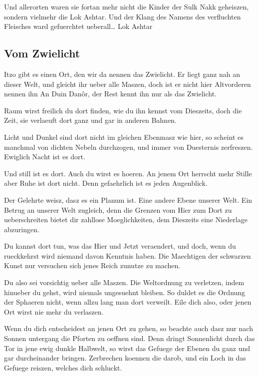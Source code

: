 \documentclass[a5paper,8pt]{book}
\begin{document}
Und allerorten waren sie fortan mehr nicht die Kinder der Sulk Nakk geheiszen, sondern vielmehr die Lok Ashtar. Und der Klang des Namens des verfluchten Fleisches ward gefuerchtet ueberall…
Lok Ashtar

\newpage

\subsection{ Vom Zwielicht}

Itzo gibt es einen Ort, den wir da nennen das Zwielicht.
Er liegt ganz nah an dieser Welt, und gleicht ihr ueber alle Maszen, doch ist er nicht hier
Altvorderen nennen ihn An Duin Danôr, der Rest kennt ihn nur als das Zwielicht.

Raum wirst freilich du dort finden, wie du ihn kennst vom Dieszeits, doch die Zeit, sie verlaeuft dort ganz und gar in anderen Bahnen.

Licht und Dunkel sind dort nicht im gleichen Ebenmasz wie hier, so scheint es manchmal von dichten Nebeln durchzogen, und immer von Duesternis zerfreszen. Ewiglich Nacht ist es dort.

Und still ist es dort. 
Auch du wirst es hoeren. An jenem Ort herrscht mehr Stille aber Ruhe ist dort nicht. Denn gefaehrlich ist es jeden Augenblick.

Der Gelehrte weisz, dasz es ein Planum ist. Eine andere Ebene unserer Welt. Ein Betrug an unserer Welt zugleich, denn die Grenzen vom Hier zum Dort zu ueberschreiten bietet dir zahllose Moeglichkeiten, dem Dieszeits eine Niederlage abzuringen.

Du kannst dort tun, was das Hier und Jetzt veraendert, und doch, wenn du rueckkehrst wird niemand davon Kenntnis haben. Die Maechtigen der schwarzen Kunst nur versuchen sich jenes Reich zunutze zu machen.

Du also sei vorsichtig ueber alle Maszen. Die Weltordnung zu verletzen, indem hinueber du gehst, wird niemals ungesuehnt bleiben. So duldet es die Ordnung der Sphaeren nicht, wenn allzu lang man dort verweilt. Eile dich also, oder jenen Ort wirst nie mehr du verlaszen.

Wenn du dich entscheidest an jenen Ort zu gehen, so beachte auch dasz nur nach Sonnen untergang die Pforten zu oeffnen sind. Denn dringt Sonnenlicht durch das Tor in jene ewig dunkle Halbwelt, so wirst das Gefuege der Ebenen du ganz und gar durcheinander bringen. Zerbrechen koennen die darob, und ein Loch in das Gefuege reiszen, welches dich schluckt.
\end{document}
